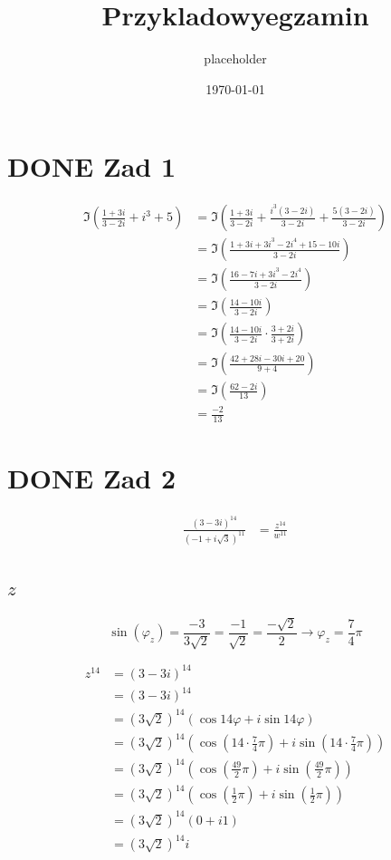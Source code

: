 \documentclass[11pt]{article}
\author{placeholder}
\date{\today}
\title{Przykladowyegzamin}
\begin{document}
\maketitle
\tableofcontents


\section{{\bfseries\sffamily DONE} Zad 1}
\label{sec:org52a4d7f}
\begin{align*}
\Im \left(\frac{1+3i}{3-2i} + i^{3} + 5\right)
 &=\Im \left(\frac{1+3i}{3-2i} + \frac{i^{3}(3-2i)}{3-2i} + \frac{5(3-2i)}{3-2i}\right)\\
 &= \Im \left(\frac{1+3i + 3i^3 - 2 i^4 + 15 - 10i}{3-2i}\right)\\
 &= \Im \left(\frac{16 - 7i + 3i^{3} -2i^{4}}{3-2i}\right)\\
 &= \Im \left(\frac{14 - 10i}{3-2i}\right)\\
 &= \Im \left(\frac{14 - 10i}{3-2i} \cdot \frac{3+2i}{3+2i}\right)\\
 &= \Im \left(\frac{42 + 28i - 30i + 20}{9 + 4}\right)\\
 &= \Im \left(\frac{62 - 2i }{13}\right)\\
 &= \frac{-2}{13}
\end{align*}
\section{{\bfseries\sffamily DONE} Zad 2}
\label{sec:org7ddee2e}
\begin{align*}
  \frac{ { (3 - 3i)}^{14} }
  { { (-1+i\sqrt{3}) }^{11} }
  &= \frac{z^{14}}{w^{11}}
\end{align*}
\subsection{\(z\)}
\label{sec:orgd0ef721}
$$\sin(\varphi_z) = \frac{-3}{3\sqrt{2}}
 = \frac{-1}{\sqrt{2}}
 = \frac{-\sqrt{2}}{2} \to \varphi_z = \frac{7}{4}\pi$$

\begin{align*}
  z^{14} &= {(3 - 3i)}^{14}\\
  &= {(3-3i)}^{14}\\
  &= {(3\sqrt{2})}^{14}(\cos 14 \varphi + i \sin 14 \varphi)\\
  &= {(3\sqrt{2})}^{14} \left(\cos \left(14 \cdot \frac{7}{4} \pi \right) + i \sin \left(14 \cdot \frac{7}{4} \pi \right) \right)\\
  &= {(3\sqrt{2})}^{14} \left( \cos \left ( \frac{49}{2} \pi \right) + i \sin \left(\frac{49}{2} \pi \right) \right)\\
  &= {(3\sqrt{2})}^{14} \left( \cos \left ( \frac{1}{2} \pi \right) + i \sin \left(\frac{1}{2} \pi \right) \right)\\
  &= {(3\sqrt{2})}^{14} ( 0 + i 1 )\\
  &= {(3\sqrt{2})}^{14}i
\end{align*}
\end{document}
